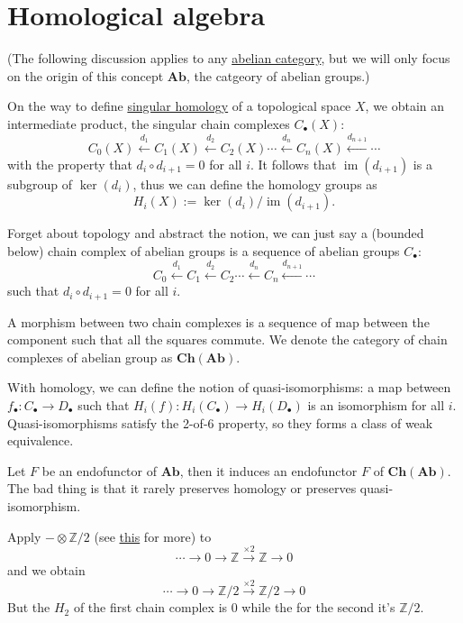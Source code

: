 \documentclass[11pt]{article}
\theoremstyle{definition}
\theoremstyle{remark}
\newcommand{\im}{\operatorname{im}}
\newcommand{\Ab}{\mathbf{Ab}}
\newcommand{\ChAb}{\mathbf{Ch}(\mathbf{Ab})}
\newcommand{\bZ}{\mathbb Z}
\begin{document}
\section{Homological algebra}\label{Homological-algebra}
(The following discussion applies to any \href{https://ncatlab.org/nlab/show/abelian+category}{abelian category},
but we will only focus on the origin of this concept $\Ab$, the catgeory of abelian groups.)

On the way to define \href{https://ncatlab.org/nlab/show/singular+homology}{singular homology} of a topological space $X$,
we obtain an intermediate product, the singular chain complexes $C_\bullet(X)$:
\[
    C_0(X) \stackrel{d_1}{\leftarrow} C_1(X) \stackrel{d_2}{\leftarrow} C_2(X)
    \cdots \stackrel{d_n}{\leftarrow} C_n(X) \stackrel{d_{n+1}}{\leftarrow} \cdots
\]
with the property that $d_i\circ d_{i+1} = 0$ for all $i$.
It follows that $\im(d_{i+1})$ is a subgroup of $\ker(d_i)$,
thus we can define the homology groups as
$$H_i(X) := \ker(d_{i}) / \im(d_{i+1}). $$

Forget about topology and abstract the notion, we can just say a (bounded below) chain complex of abelian groups is
a sequence of abelian groups $C_\bullet$:
\[
    C_0 \stackrel{d_1}{\leftarrow} C_1 \stackrel{d_2}{\leftarrow} C_2
    \cdots \stackrel{d_n}{\leftarrow} C_n \stackrel{d_{n+1}}{\leftarrow} \cdots
\]
such that $d_i \circ d_{i+1} = 0$ for all $i$.

A morphism between two chain complexes is a sequence of map between the component such that all the squares commute.
We denote the category of chain complexes of abelian group as $\ChAb$.

With homology, we can define the notion of quasi-isomorphisms: a map between $f_\bullet: C_\bullet \to D_\bullet$
such that $H_i(f) : H_i(C_\bullet) \to H_i(D_\bullet)$ is an isomorphism for all $i$.
Quasi-isomorphisms satisfy the 2-of-6 property, so they forms a class of weak equivalence.

Let $F$ be an endofunctor of $\Ab$, then it induces an endofunctor $F$ of $\ChAb$.
The bad thing is that it rarely preserves homology or preserves quasi-isomorphism.

Apply $-\otimes \bZ/2$ (see \href{https://ncatlab.org/nlab/show/tensor+product+of+abelian+groups}{this} for more) to
\[
    \cdots \longrightarrow 0 \longrightarrow \bZ \stackrel{\times 2}{\longrightarrow} \bZ \longrightarrow 0
\]
and we obtain
\[
    \cdots \longrightarrow 0 \longrightarrow \bZ/2 \stackrel{\times 2}{\longrightarrow} \bZ/2 \longrightarrow 0
\]
But the $H_2$ of the first chain complex is $0$ while the for the second it's $\bZ/2$.
\end{document}
